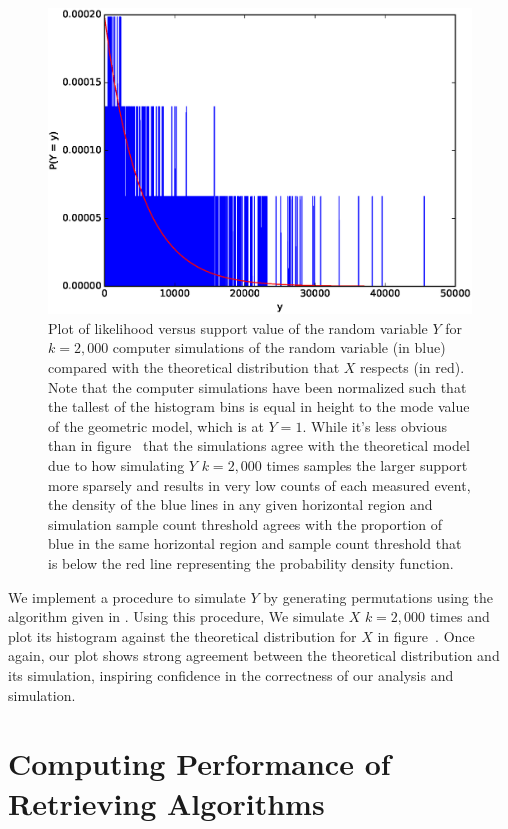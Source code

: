 \documentclass[11pt, oneside]{article}   	%
\begin{document}
\begin{figure}\label{fig:y}
\includegraphics[scale=.5]{part_1_problem_5}
\caption{Plot of likelihood versus support value of the random variable $Y$ for $k = 2,000$ computer simulations of the random variable (in blue) compared with the theoretical distribution that $X$ respects (in red). Note that the computer simulations have been normalized such that the tallest of the histogram bins is equal in height to the mode value of the geometric model, which is at $Y = 1$. While it's less obvious than in figure~\label{fig:x} that the simulations agree with the theoretical model due to how simulating $Y$ $k = 2,000$ times samples the larger support more sparsely and results in very low counts of each measured event, the density of the blue lines in any given horizontal region and simulation sample count threshold agrees with the proportion of blue in the same horizontal region and sample count threshold that is below the red line representing the probability density function.}
\end{figure}

We implement a procedure to simulate $Y$ by generating permutations using the algorithm given in \label{sssec:perm}. Using this procedure, We simulate $X$ $k = 2,000$ times and plot its histogram against the theoretical distribution for $X$ in figure~\label{fig:y}. Once again, our plot shows strong agreement between the theoretical distribution and its simulation, inspiring confidence in the correctness of our analysis and simulation.

\section{Computing Performance of Retrieving Algorithms}
\subsection{}
\subsection{}
\subsection{}
\subsection{}
\subsection{}
\end{document}
